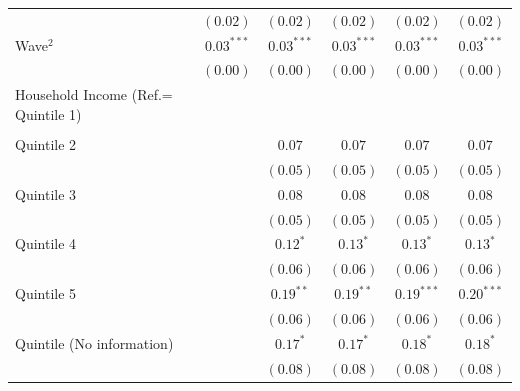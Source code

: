 \documentclass[
  12pt,
  a4paper,
]{article}
\begin{document}
\begin{table}[!ht]
\begin{center}
{\begin{tabular}{l c c c c c c}
                                    &               & $(0.02)$      & $(0.02)$      & $(0.02)$      & $(0.02)$      & $(0.02)$      \\
Wave$^2$                            &               & $0.03^{***}$  & $0.03^{***}$  & $0.03^{***}$  & $0.03^{***}$  & $0.03^{***}$  \\
                                    &               & $(0.00)$      & $(0.00)$      & $(0.00)$      & $(0.00)$      & $(0.00)$      \\
Household Income (Ref.= Quintile 1) &               &               &               &               &               &               \\
                                    &               &               &               &               &               &               \\
\quad Quintile 2                    &               &               & $0.07$        & $0.07$        & $0.07$        & $0.07$        \\
                                    &               &               & $(0.05)$      & $(0.05)$      & $(0.05)$      & $(0.05)$      \\
\quad Quintile 3                    &               &               & $0.08$        & $0.08$        & $0.08$        & $0.08$        \\
                                    &               &               & $(0.05)$      & $(0.05)$      & $(0.05)$      & $(0.05)$      \\
\quad Quintile 4                    &               &               & $0.12^{*}$    & $0.13^{*}$    & $0.13^{*}$    & $0.13^{*}$    \\
                                    &               &               & $(0.06)$      & $(0.06)$      & $(0.06)$      & $(0.06)$      \\
\quad Quintile 5                    &               &               & $0.19^{**}$   & $0.19^{**}$   & $0.19^{***}$  & $0.20^{***}$  \\
                                    &               &               & $(0.06)$      & $(0.06)$      & $(0.06)$      & $(0.06)$      \\
\quad Quintile (No information)     &               &               & $0.17^{*}$    & $0.17^{*}$    & $0.18^{*}$    & $0.18^{*}$    \\
                                    &               &               & $(0.08)$      & $(0.08)$      & $(0.08)$      & $(0.08)$      \\

\end{tabular}}
\end{center}
\end{table}
\end{document}
